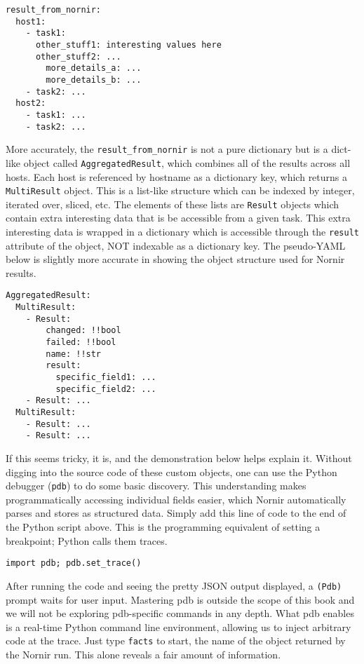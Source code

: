 \begin{verbatim}
result_from_nornir:
  host1:
    - task1:
      other_stuff1: interesting values here
      other_stuff2: ...
        more_details_a: ...
        more_details_b: ...
    - task2: ...
  host2:
    - task1: ...
    - task2: ...
\end{verbatim}

More accurately, the \verb|result_from_nornir| is not a pure dictionary but is
a dict-like object called \verb|AggregatedResult|, which combines all of the
results across all hosts. Each host is referenced by hostname as a dictionary
key, which returns a \verb|MultiResult| object. This is a list-like structure
which can be indexed by integer, iterated over, sliced, etc. The elements of
these lists are \verb|Result| objects which contain extra interesting data
that is be accessible from a given task. This extra interesting data is
wrapped in a dictionary which is accessible through the \verb|result|
attribute of the object, NOT indexable as a dictionary key. The pseudo-YAML
below is slightly more accurate in showing the object structure used for
Nornir results.

\begin{verbatim}
AggregatedResult:
  MultiResult:
    - Result:
        changed: !!bool
        failed: !!bool
        name: !!str
        result:
          specific_field1: ...
          specific_field2: ...
    - Result: ...
  MultiResult:
    - Result: ...
    - Result: ...
\end{verbatim}

If this seems tricky, it is, and the demonstration below helps explain it.
Without digging into the source code of these custom objects, one can use the
Python debugger (\verb|pdb|) to do some basic discovery. This understanding
makes programmatically accessing individual fields easier, which Nornir
automatically parses and stores as structured data. Simply add this line of
code to the end of the Python script above. This is the programming equivalent
of setting a breakpoint; Python calls them traces.

\begin{verbatim}
import pdb; pdb.set_trace()
\end{verbatim}

After running the code and seeing the pretty JSON output displayed, a \verb|(Pdb)|
prompt waits for user input. Mastering pdb is outside the scope of this book
and we will not be exploring pdb-specific commands in any depth. What pdb
enables is a real-time Python command line environment, allowing us to inject
arbitrary code at the trace. Just type \verb|facts| to start, the name
of the object returned by the Nornir run. This alone reveals a fair amount of
information.

